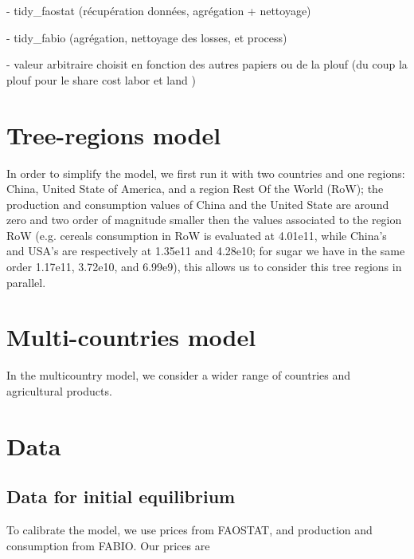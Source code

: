 - tidy\_faostat (récupération données, agrégation + nettoyage)

- tidy\_fabio (agrégation, nettoyage des losses, et process)

- valeur arbitraire choisit en fonction des autres papiers ou de la plouf (du coup la plouf pour le share cost labor et land )

\section{Tree-regions model}
In order to simplify the model, we first run it with two countries and one regions: China, United State of America, and a region Rest Of the World (RoW); the production and consumption values of China and the United State are around zero and two order of magnitude smaller then the values associated to the region RoW (e.g. cereals consumption in RoW is evaluated at 4.01e11, while China's and USA's are respectively at 1.35e11 and 4.28e10; for sugar we have in the same order 1.17e11, 3.72e10, and 6.99e9), this allows us to consider this tree regions in parallel.



\section{Multi-countries model}
In the multicountry model, we consider a wider range of countries and agricultural products.


\section{Data}
\subsection{Data for initial equilibrium}
To calibrate the model, we use prices from FAOSTAT, and production and consumption from FABIO. Our prices are